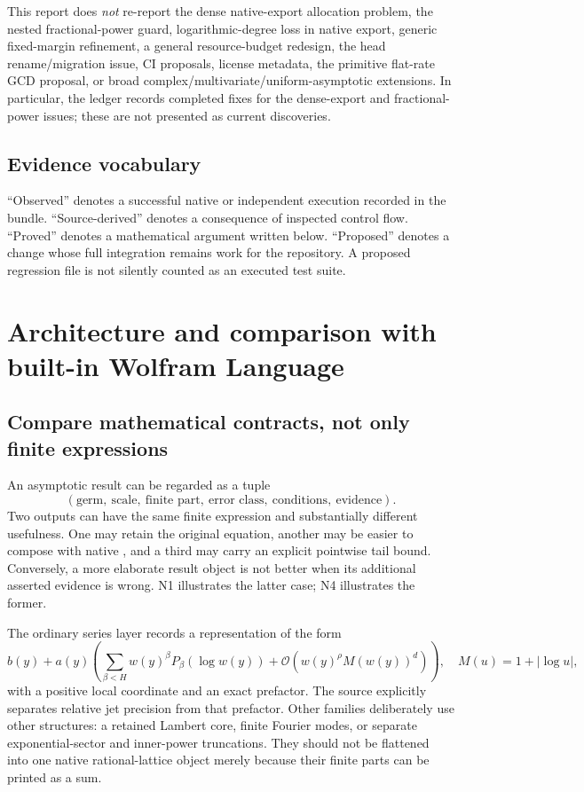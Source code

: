 \documentclass[11pt,letterpaper]{article}
\newcommand{\code}[1]{\texttt{\detokenize{#1}}}
\newcommand{\OO}{\mathcal O}
\begin{document}
This report does \emph{not} re-report the dense native-export allocation problem,
the nested fractional-power guard, logarithmic-degree loss in native export,
generic fixed-margin refinement, a general resource-budget redesign, the head
rename/migration issue, CI proposals, license metadata, the primitive flat-rate
GCD proposal, or broad complex/multivariate/uniform-asymptotic extensions.
In particular, the ledger records completed fixes for the dense-export and
fractional-power issues; these are not presented as current discoveries.
\cite{status}

\subsection{Evidence vocabulary}
``Observed'' denotes a successful native or independent execution recorded in
the bundle. ``Source-derived'' denotes a consequence of inspected control flow.
``Proved'' denotes a mathematical argument written below. ``Proposed'' denotes
a change whose full integration remains work for the repository. A proposed
regression file is not silently counted as an executed test suite.

\section{Architecture and comparison with built-in Wolfram Language}
\label{sec:comparison}
\subsection{Compare mathematical contracts, not only finite expressions}
An asymptotic result can be regarded as a tuple
\[
 (\text{germ},\ \text{scale},\ \text{finite part},\ \text{error class},\
  \text{conditions},\ \text{evidence}).
\]
Two outputs can have the same finite expression and substantially different
usefulness. One may retain the original equation, another may be easier to
compose with native \code{SeriesData}, and a third may carry an explicit
pointwise tail bound. Conversely, a more elaborate result object is not better
when its additional asserted evidence is wrong. N1 illustrates the latter
case; N4 illustrates the former.

The ordinary series layer records a representation of the form
\[
 b(y)+a(y)\left(\sum_{\beta<H}w(y)^\beta P_\beta(\log w(y))
                 +\OO\!\left(w(y)^\rho M(w(y))^d\right)\right),
 \quad M(u)=1+|\log u|,
\]
with a positive local coordinate and an exact prefactor. The source explicitly
separates relative jet precision from that prefactor. Other families deliberately
use other structures: a retained Lambert core, finite Fourier modes, or separate
exponential-sector and inner-power truncations. They should not be flattened
into one native rational-lattice object merely because their finite parts can
be printed as a sum.\cite{seriesops,reciprocal,gammaops,flatops}
\end{document}
